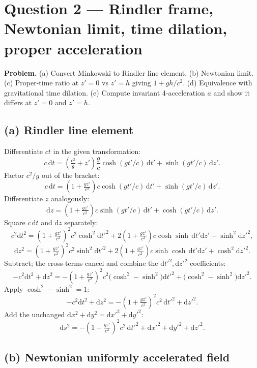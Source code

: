 \documentclass[11pt]{article}
\newcommand{\de}{\mathrm{d}}
\begin{document}
\section*{Question 2 --- Rindler frame, Newtonian limit, time dilation, proper acceleration}

\textbf{Problem.} (a) Convert Minkowski to Rindler line element. (b) Newtonian limit. (c) Proper-time ratio at $z'=0$ vs $z'=h$ giving $1+gh/c^2$. (d) Equivalence with gravitational time dilation. (e) Compute invariant 4-acceleration $a$ and show it differs at $z'=0$ and $z'=h$.

\subsection*{(a) Rindler line element}

Differentiate $ct$ in the given transformation:
\[ c\,\de t = \left(\tfrac{c^2}{g} + z'\right)\frac{g}{c}\cosh(gt'/c)\,\de t' + \sinh(gt'/c)\,\de z'. \]
Factor $c^2/g$ out of the bracket:
\[ c\,\de t = \left(1 + \tfrac{gz'}{c^2}\right) c\cosh(gt'/c)\,\de t' + \sinh(gt'/c)\,\de z'. \]
Differentiate $z$ analogously:
\[ \de z = \left(1 + \tfrac{gz'}{c^2}\right) c\sinh(gt'/c)\,\de t' + \cosh(gt'/c)\,\de z'. \]
Square $c\,\de t$ and $\de z$ separately:
\[ c^2\de t^2 = \left(1+\tfrac{gz'}{c^2}\right)^{\!2}c^2\cosh^2\!\de t'^2 + 2\left(1+\tfrac{gz'}{c^2}\right)c\cosh\sinh\,\de t'\de z' + \sinh^2\!\de z'^2, \]
\[ \de z^2 = \left(1+\tfrac{gz'}{c^2}\right)^{\!2}c^2\sinh^2\!\de t'^2 + 2\left(1+\tfrac{gz'}{c^2}\right)c\sinh\cosh\,\de t'\de z' + \cosh^2\!\de z'^2. \]
Subtract; the cross-terms cancel and combine the $\de t'^2,\de z'^2$ coefficients:
\[ -c^2\de t^2 + \de z^2 = -\left(1+\tfrac{gz'}{c^2}\right)^{\!2}c^2\bigl(\cosh^2-\sinh^2\bigr)\de t'^2 + \bigl(\cosh^2-\sinh^2\bigr)\de z'^2. \]
Apply $\cosh^2-\sinh^2=1$:
\[ -c^2\de t^2 + \de z^2 = -\left(1+\tfrac{gz'}{c^2}\right)^{\!2} c^2\,\de t'^2 + \de z'^2. \]
Add the unchanged $\de x^2 + \de y^2 = \de x'^2+\de y'^2$:
\begin{equation}
\boxed{\;\de s^2 = -\left(1+\tfrac{gz'}{c^2}\right)^{\!2}c^2\,\de t'^2 + \de x'^2 + \de y'^2 + \de z'^2.\;}
\label{eq:rindler}
\end{equation}

\subsection*{(b) Newtonian uniformly accelerated field}
\end{document}
